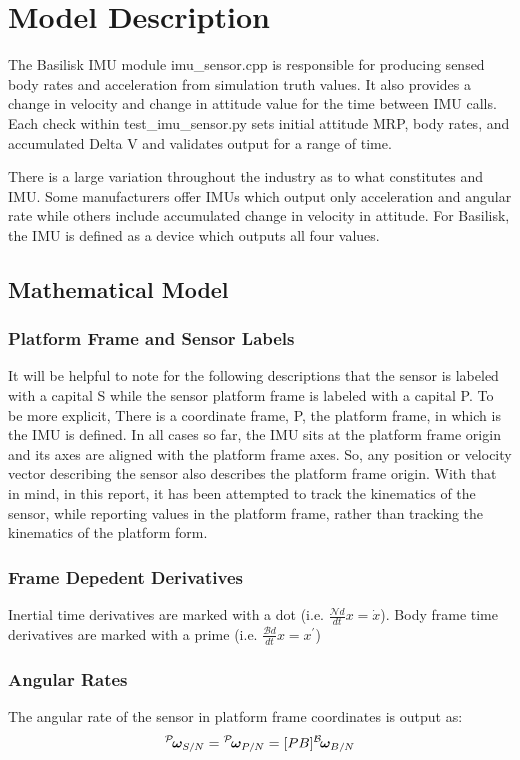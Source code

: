 \section{Model Description}
The Basilisk IMU module imu\_sensor.cpp is responsible for producing sensed body rates and acceleration from simulation truth values. It also provides a change in velocity and change in attitude value for the time between IMU calls. Each check within test\_imu\_sensor.py sets initial attitude MRP, body rates, and accumulated Delta V and validates output for a range of time.

There is a large variation throughout the industry as to what constitutes and IMU.  Some manufacturers offer IMUs which output only acceleration and angular rate while others include accumulated change in velocity in attitude. For Basilisk, the IMU is defined as a device which outputs all four values.

\subsection{Mathematical Model}
\subsubsection{Platform Frame and Sensor Labels}
It will be helpful to note for the following descriptions that the sensor is labeled with a capital S while the sensor platform frame is labeled with a capital P. To be more explicit, There is a coordinate frame, P, the platform frame, in which is the IMU is defined. In all cases so far, the IMU sits at the platform frame origin and its axes are aligned with the platform frame axes. So, any position or velocity vector describing the sensor also describes the platform frame origin. With that in mind, in this report, it has been attempted to track the kinematics of the sensor, while reporting values in the platform frame, rather than tracking the kinematics of the platform form.

\subsubsection{Frame Depedent Derivatives}
Inertial time derivatives are marked with a dot (i.e. $\frac{\mathcal{N}d}{dt}x = \dot{x}$). Body frame time derivatives are marked with a prime (i.e. $\frac{\mathcal{B}d}{dt}x = x^\prime$)
\subsubsection{Angular Rates}
The angular rate of the sensor in platform frame coordinates is output as:
\begin{equation}
	 \leftexp{P}{\bm{\omega}_{S/N}} =  \leftexp{P}{\bm{\omega}_{P/N}} =[PB] \leftexp{B}{\bm{\omega}_{B/N}}
\end{equation}

